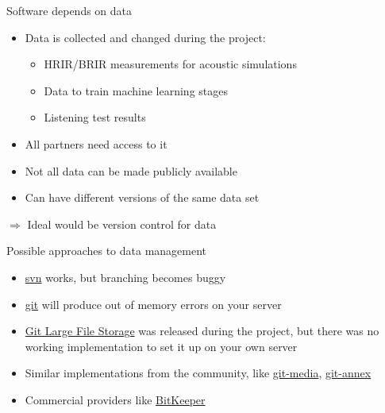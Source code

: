 \documentclass{beamer}
\begin{document}
\begin{frame}{Software depends on data}

    \begin{itemize}
        \item Data is collected and changed during the project:
            \begin{itemize}
                \item HRIR/BRIR measurements for acoustic simulations
                \item Data to train machine learning stages
                \item Listening test results
            \end{itemize}
        \item All partners need access to it
        \item Not all data can be made publicly available
        \item Can have different versions of the same data set
    \end{itemize}

    \vspace{0.5cm}

    $\Rightarrow$ Ideal would be version control for data

\end{frame}

\begin{frame}{Possible approaches to data management}

    \begin{itemize}
        \item \href{https://subversion.apache.org}{svn} works, but branching becomes buggy
        \item \href{https://git-scm.com}{git} will produce out of memory errors on your server
            \item \href{https://git-lfs.github.com}{Git Large File Storage} was released during the project, but
            there was no working implementation to set it up on your own server
        \item Similar implementations from the community, like
            \href{https://github.com/alebedev/git-media}{git-media},
            \href{https://git-annex.branchable.com}{git-annex}
        \item Commercial providers like
            \href{http://www.bitkeeper.com/bam.html}{BitKeeper}
    \end{itemize}

\end{frame}
\end{document}

